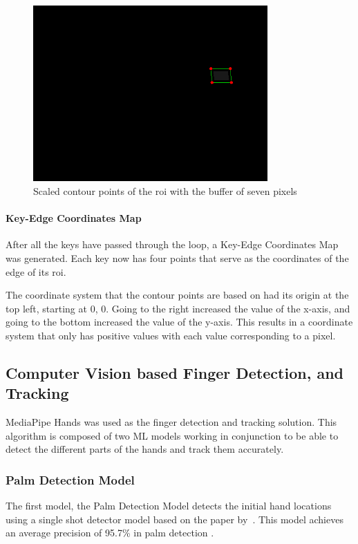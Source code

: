 \documentclass{report}
\begin{document}
\begin{figure}[H]
	\centering
	\includegraphics[width=0.8\textwidth]{scaled-contour.png}
	\caption{Scaled contour points of the \ac{roi} with the buffer of seven pixels}
	\label{fig:metho-algo-scale-roi}
	\centering
\end{figure}

\paragraph{Key-Edge Coordinates Map}
After all the keys have passed through the loop, a Key-Edge Coordinates Map was
generated. Each key now has four points that serve as the coordinates of the
edge of its \ac{roi}.

The coordinate system that the contour points are based on had its origin at the
top left, starting at 0, 0. Going to the right increased the value of the
x-axis, and going to the bottom increased the value of the y-axis. This results
in a coordinate system that only has positive values with each value
corresponding to a pixel.


\subsection{Computer Vision based Finger Detection, and Tracking}
\label{section:metho-algo-finger}
MediaPipe Hands was used as the finger detection and tracking solution. This
algorithm is composed of two ML models working in conjunction to be able to
detect the different parts of the hands and track them accurately.

\subsubsection{Palm Detection Model}
The first model, the Palm Detection Model detects the initial hand locations
using a single shot detector model based on the paper by~\textcite{ssd}. This model
achieves an average precision of 95.7\% in palm detection
\parencite{mediapipe-hands}.
\end{document}
